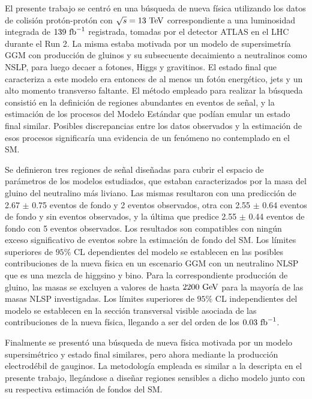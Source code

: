 El presente trabajo se centró en una búsqueda de nueva física utilizando los datos de colisión protón-protón con $\sqrt{s}=13\ \text{TeV}$ correspondiente a una luminosidad integrada de $139\ \text{fb}^{-1}$ registrada, tomadas por el detector ATLAS en el LHC durante el Run 2. La misma estaba motivada por un modelo de supersimetría GGM con producción de gluinos y su subsecuente decaimiento a neutralinos como NSLP, para luego decaer a fotones, Higgs y gravitinos. El estado final que caracteriza a este modelo era entonces de al menos un fotón energético, jets y un alto momento transverso faltante. El método empleado para realizar la búsqueda consistió en la definición de regiones abundantes en eventos de señal, y la estimación de los procesos del Modelo Estándar que podían emular un estado final similar. Posibles discrepancias entre los datos observados y la estimación de esos procesos significaría una evidencia de un fenómeno no contemplado en el SM. 

Se definieron tres regiones de señal diseñadas para cubrir el espacio de parámetros de los modelos estudiados, que estaban caracterizados por la masa del gluino del neutralino más liviano. Las mismas resultaron con una predicción de 2.67 $\pm$ 0.75 eventos de fondo y 2 eventos observados, otra con 2.55 $\pm$ 0.64 eventos de fondo y sin eventos observados, y la última que predice 2.55 $\pm$ 0.44 eventos de fondo con 5 eventos observados.
Los resultados son compatibles con ningún exceso significativo de eventos sobre la estimación de fondo del SM. Los límites superiores de $95\%$ CL dependientes del modelo se establecen en las posibles contribuciones de la nueva física en un escenario GGM con un neutralino NLSP que es una mezcla de higgsino y bino. Para la correspondiente producción de gluino, las masas se excluyen a valores de hasta $2200\ \text{GeV}$ para la mayoría de las masas NLSP investigadas. Los límites superiores de $95\%$ CL independientes del modelo se establecen en la sección transversal visible asociada de las contribuciones de la nueva física, llegando a ser del orden de los $0.03\ \text{fb}^{-1}$. 

Finalmente se presentó una búsqueda de nueva física motivada por un modelo supersimétrico y estado final similares, pero ahora mediante la producción electrodébil de gauginos. La metodología empleada es similar a la descripta en el presente trabajo, llegándose a diseñar regiones sensibles a dicho modelo junto con su respectiva estimación de fondos del SM.
